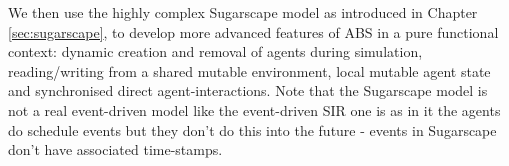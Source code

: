 We then use the highly complex Sugarscape model as introduced in Chapter \ref{sec:sugarscape}, to develop more advanced features of ABS in a pure functional context: dynamic creation and removal of agents during simulation, reading/writing from a shared mutable environment, local mutable agent state and synchronised direct agent-interactions. 
Note that the Sugarscape model is not a real event-driven model like the event-driven SIR one is as in it the agents do schedule events but they don't do this into the future - events in Sugarscape don't have associated time-stamps.










